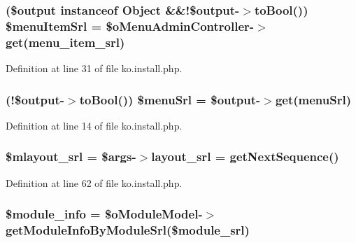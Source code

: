 \subsubsection[{\$menu\+Item\+Srl}]{ (\$output instanceof {\bf Object} \&\&!\$output-\/$>$to\+Bool()) \$menu\+Item\+Srl = \$o\+Menu\+Admin\+Controller-\/$>$get(\textquotesingle{}menu\+\_\+item\+\_\+srl\textquotesingle{})}\label{ko_8install_8php_a874928b6d7b44487718f1ede4a9f6ffe}


Definition at line 31 of file ko.\+install.\+php.

\hypertarget{ko_8install_8php_abb9a711d32f19d7aff02c8501ad6fb55}{}
\subsubsection[{\$menu\+Srl}]{ (!\$output-\/$>$to\+Bool()) \$menu\+Srl = \$output-\/$>$get(\textquotesingle{}menu\+Srl\textquotesingle{})}\label{ko_8install_8php_abb9a711d32f19d7aff02c8501ad6fb55}


Definition at line 14 of file ko.\+install.\+php.

\hypertarget{ko_8install_8php_a576210f0eec2e42df2c40e04a3972bb0}{}
\subsubsection[{\$mlayout\+\_\+srl}]{\setlength{\rightskip}{0pt plus 5cm}\${\bf mlayout\+\_\+srl} = \$args-\/$>${\bf layout\+\_\+srl} = {\bf get\+Next\+Sequence}()}\label{ko_8install_8php_a576210f0eec2e42df2c40e04a3972bb0}


Definition at line 62 of file ko.\+install.\+php.

\hypertarget{ko_8install_8php_a5e701819149f6ea0893d4b79010417d3}{}
\subsubsection[{\$module\+\_\+info}]{\setlength{\rightskip}{0pt plus 5cm}\$module\+\_\+info = \$o\+Module\+Model-\/$>$get\+Module\+Info\+By\+Module\+Srl(\${\bf module\+\_\+srl})}\label{ko_8install_8php_a5e701819149f6ea0893d4b79010417d3}


